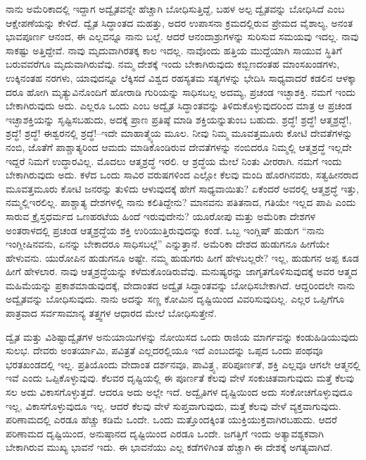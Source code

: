 ನಾನು ಅಮೆರಿಕಾದಲ್ಲಿ ಇದ್ದಾಗ ಅದ್ವೈತವನ್ನೇ ಹೆಚ್ಚಾಗಿ ಬೋಧಿಸುತ್ತಿದ್ದೆ, ಬಹಳ ಅಲ್ಪ ದ್ವೈತವನ್ನು ಬೋಧಿಸಿದೆ ಎಂಬ ಆಕ್ಷೇಪಣೆಯನ್ನು ಕೇಳಿದೆ. ದ್ವೈತ ಸಿದ್ಧಾಂತದ ಮಹತ್ತು, ಅದರ ಉಪಾಸನಾ ಕ್ರಮದಲ್ಲಿರುವ ಪ್ರೇಮದ ವೈಶಾಲ್ಯ, ಅನಂತ ಭಾವಪೂರ್ಣ ಆನಂದ, ಈ ಎಲ್ಲವನ್ನೂ ನಾನು ಬಲ್ಲೆ. ಆದರೆ ಆನಂದಾಶ್ರುಗಳನ್ನು ಸುರಿಸುವ ಸಮಯವು ಇದಲ್ಲ. ನಾವು ಸಾಕಷ್ಟು ಅತ್ತಿದ್ದೇವೆ. ನಾವು ಮೃದುವಾಗಿರತಕ್ಕ ಕಾಲ ಇದಲ್ಲ. ನಾವೊಂದು ಹತ್ತಿಯ ಮುದ್ದೆಯಾಗಿ ಸಾಯುವ ಸ್ಥಿತಿಗೆ ಬರುವವರೆಗೂ ಮೃದುವಾಗಿರುವೆವು. ನಮ್ಮ ದೇಶಕ್ಕೆ ಇಂದು ಬೇಕಾಗಿರುವುದು ಕಬ್ಬಿಣದಂತಹ ಮಾಂಸಖಂಡಗಳು, ಉಕ್ಕಿನಂತಹ ನರಗಳು, ಯಾವುದನ್ನೂ ಲೆಕ್ಕಿಸದೆ ವಿಶ್ವದ ರಹಸ್ಯತಮ ಸತ್ಯಗಳನ್ನು ಭೇದಿಸಿ ಸಾಧ್ಯವಾದರೆ ಕಡಲಿನ ಆಳಕ್ಕಾ ದರೂ ಹೋಗಿ ಮೃತ್ಯುವಿನೊಂದಿಗೆ ಹೋರಾಡಿ ಗುರಿಯನ್ನು ಸಾಧಿಸಬಲ್ಲ ಅದಮ್ಯ, ಪ್ರಚಂಡ ಇಚ್ಛಾಶಕ್ತಿ. ನಮಗೆ ಇಂದು ಬೇಕಾಗಿರುವುದು ಅದು. ಎಲ್ಲರೂ ಒಂದು ಎಂಬ ಅದ್ವೈತ ಸಿದ್ಧಾಂತವನ್ನು ತಿಳಿದುಕೊಳ್ಳುವುದರಿಂದ ಮಾತ್ರ ಆ ಪ್ರಚಂಡ ಇಚ್ಛಾಶಕ್ತಿಯನ್ನು ಸೃಷ್ಟಿಸಬಹುದು, ಅದಕ್ಕೆ ಪ್ರಾಣ ಪ್ರತಿಷ್ಠೆ ಮಾಡಿ ಶಕ್ತಿಯನ್ನುತುಂಬ ಬಹುದು. ಶ್ರದ್ಧೆ! ಶ್ರದ್ಧೆ! ಆತ್ಮಶ್ರದ್ಧೆ!, ಶ್ರದ್ಧೆ! ಶ್ರದ್ಧೆ! ಈಶ್ವರನಲ್ಲಿ ಶ್ರದ್ಧೆ!–ಇದೇ ಮಾಹಾತ್ಮ್ಯೆಯ ಮೂಲ. ನೀವು ನಿಮ್ಮ ಮೂವತ್ತಮೂರು ಕೋಟಿ ದೇವತೆಗಳನ್ನು ನಂಬಿ, ಜೊತೆಗೆ ಪಾಶ್ಚಾತ್ಯರಿಂದ ಆಮದು ಮಾಡಿಕೊಂಡಿರುವ ದೇವತೆಗಳನ್ನು ನಂಬಿದರೂ ನಿಮ್ಮಲ್ಲಿ ಆತ್ಮಶ್ರದ್ಧೆ ಇಲ್ಲದೇ ಇದ್ದರೆ ನಿಮಗೆ ಉದ್ಧಾರವಿಲ್ಲ. ಮೊದಲು ಆತ್ಮಶ್ರದ್ಧೆ ಇರಲಿ. ಆ ಶ್ರದ್ಧೆಯ ಮೇಲೆ ನಿಂತು ವೀರರಾಗಿ. ನಮಗೆ ಇಂದು ಬೇಕಾಗಿರುವುದು ಅದು. ಕಳೆದ ಒಂದು ಸಾವಿರ ವರುಷಗಳಿಂದ ಎಲ್ಲೋ ಕೆಲವು ಮಂದಿ ಹೊರಗಿನವರು, ಸತ್ವಹೀನರಾದ ಮೂವತ್ತಮೂರು ಕೋಟಿ ಜನರನ್ನು ತುಳಿದು ಆಳುವುದಕ್ಕೆ ಹೇಗೆ ಸಾಧ್ಯವಾಯಿತು? ಏಕೆಂದರೆ ಅವರಲ್ಲಿ ಆತ್ಮಶ್ರದ್ಧೆ ಇತ್ತು, ನಮ್ಮಲ್ಲಿ\break ಇರಲಿಲ್ಲ. ಪಾಶ್ಚಾತ್ಯ ದೇಶಗಳಲ್ಲಿ ನಾನು ಕಲಿತಿದ್ದೇನು? ಮಾನವನು ಪತಿತನಾದ, ಗತಿಯೇ ಇಲ್ಲದ ಪಾಪಿ ಎಂದು ಸಾರುವ ಕ್ರೈಸ್ತಧರ್ಮದ ಒಣಹರಟೆಯ ಹಿಂದೆ ಇರುವುದೇನು? ಯೂರೋಪು ಮತ್ತು ಅಮೆರಿಕಾ ದೇಶಗಳ ಅಂತರಾಳದಲ್ಲಿ ಪ್ರಚಂಡ ಆತ್ಮಶ್ರದ್ಧೆಯ ಶಕ್ತಿ ಉರಿಯುತ್ತಿರುವುದನ್ನು ಕಂಡೆ. ಒಬ್ಬ ಇಂಗ್ಲಿಷ್​ ಹುಡುಗ “ನಾನು ಇಂಗ್ಲೀಷಿನವನು, ಏನನ್ನು ಬೇಕಾದರೂ ಸಾಧಿಸಬಲ್ಲೆ” ಎನ್ನುತ್ತಾನೆ. ಅಮೆರಿಕಾ ದೇಶದ ಹುಡುಗನೂ ಹೀಗೆಯೇ ಹೇಳುವನು. ಯುರೋಪಿನ ಹುಡುಗನೂ ಅಷ್ಟೇ. ನಮ್ಮ ಹುಡುಗರು ಹೀಗೆ ಹೇಳಬಲ್ಲರೇ? ಇಲ್ಲ, ಹುಡುಗನ ಅಪ್ಪ ಕೂಡ ಹೀಗೆ ಹೇಳಲಾರ. ನಾವು ಆತ್ಮಶ್ರದ್ಧೆಯನ್ನು ಕಳೆದುಕೊಂಡಿರುವೆವು. ಮನುಷ್ಯರನ್ನು ಜಾಗೃತಗೊಳಿಸುವುದಕ್ಕೆ ಅವರ ಆತ್ಮದ ಮಹಿಮೆಯನ್ನು ಪ್ರಕಾಶಮಾಡುವುದಕ್ಕೆ, ವೇದಾಂತದ ಅದ್ವೈತ ಸಿದ್ಧಾಂತವನ್ನು ಬೋಧಿಸಬೇಕಾಗಿದೆ. ಆದ್ದರಿಂದಲೇ ನಾನು ಅದ್ವೈತವನ್ನು ಬೋಧಿಸುವುದು. ನಾನು ಅದನ್ನು ಸಣ್ಣ ಕೋಮಿನ ದೃಷ್ಟಿಯಿಂದ ವಿವರಿಸುವುದಿಲ್ಲ. ಎಲ್ಲರ ಒಪ್ಪಿಗೆಗೂ ಪಾತ್ರವಾದ ಸರ್ವಸಾಮಾನ್ಯ ತತ್ತ್ವಗಳ ಆಧಾರದ ಮೇಲೆ ಬೋಧಿಸುತ್ತೇನೆ.

ದ್ವೈತ ಮತ್ತು ವಿಶಿಷ್ಟಾದ್ವೈತಗಳ ಅನುಯಾಯಿಗಳನ್ನು ನೋಯಿಸದ ಒಂದು ರಾಜಿಯ ಮಾರ್ಗವನ್ನು ಕಂಡುಹಿಡಿಯುವುದು ಸುಲಭ. ದೇವರು ಅಂತರ್ಯಾಮಿ, ಪವಿತ್ರತೆ ಎಲ್ಲದರಲ್ಲಿಯೂ ಇದೆ ಎಂಬುದನ್ನು ಒಪ್ಪದ ಒಂದು ಪಂಥವೂ ಭರತಖಂಡದಲ್ಲಿ ಇಲ್ಲ. ಪ್ರತಿಯೊಂದು ವೇದಾಂತ ದರ್ಶನವೂ, ಪಾವಿತ್ರ್ಯ, ಪರಿಪೂರ್ಣತೆ, ಶಕ್ತಿ ಎಲ್ಲವೂ ಆಗಲೇ ಆತ್ಮನಲ್ಲಿ ಇವೆ ಎಂದು ಒಪ್ಪಿಕೊಳ್ಳುವುವು. ಕೆಲವರ ದೃಷ್ಟಿಯಲ್ಲಿ ಈ ಪೂರ್ಣತೆ ಕೆಲವು ವೇಳೆ ಸಂಕುಚಿತವಾಗುವುದು ಮತ್ತೆ ಕೆಲವು ಸಲ ಅದು ವಿಕಾಸಗೊಳ್ಳುತ್ತದೆ. ಆದರೂ ಅದು ಅಲ್ಲೇ ಇದೆ. ಅದ್ವೈತಿಗಳ ದೃಷ್ಟಿಯಿಂದ ಅದು ಸಂಕೋಚಗೊಳ್ಳುವುದೂ ಇಲ್ಲ, ವಿಕಾಸಗೊಳ್ಳುವುದೂ ಇಲ್ಲ. ಆದರೆ ಕೆಲವು ವೇಳೆ ಸುಪ್ತವಾಗುವುದು, ಮತ್ತೆ ಕೆಲವು ವೇಳೆ ವ್ಯಕ್ತವಾಗುವುದು. ಪರಿಣಾಮದಲ್ಲಿ ಎರಡೂ ಹೆಚ್ಚು ಕಡಿಮೆ ಒಂದೇ. ಒಂದು ಮತ್ತೊಂದಕ್ಕಿಂತ ಯುಕ್ತಿಯುಕ್ತವಾಗಿರಬಹುದು. ಆದರೆ ಪರಿಣಾಮದ ದೃಷ್ಟಿಯಿಂದ, ಅನುಷ್ಠಾನದ ದೃಷ್ಟಿಯಿಂದ ಎರಡೂ ಒಂದೇ. ಜಗತ್ತಿಗೆ ಇಂದು ಅತ್ಯಾವಶ್ಯಕವಾಗಿ ಬೇಕಾಗಿರುವ ಮುಖ್ಯ ಭಾವನೆ ಇದು. ಈ ಭಾವನೆಯು ಎಲ್ಲ ಕಡೆಗಳಿಗಿಂತ ಹೆಚ್ಚಾಗಿ ಈ ದೇಶಕ್ಕೆ ಅಗತ್ಯವಾಗಿದೆ.

